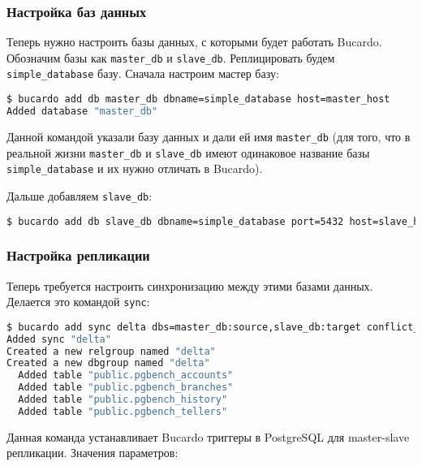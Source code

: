\subsubsection{Настройка баз данных}

Теперь нужно настроить базы данных, с которыми будет работать Bucardo. Обозначим базы как \lstinline!master_db! и \lstinline!slave_db!. Реплицировать будем \lstinline!simple_database! базу. Сначала настроим мастер базу:

\begin{lstlisting}[language=Bash,label=lst:bucardo7,caption=Настройка баз данных]
$ bucardo add db master_db dbname=simple_database host=master_host
Added database "master_db"
\end{lstlisting}

Данной командой указали базу данных и дали ей имя \lstinline!master_db! (для того, что в реальной жизни \lstinline!master_db! и \lstinline!slave_db! имеют одинаковое название базы \lstinline!simple_database! и их нужно отличать в Bucardo).

Дальше добавляем \lstinline!slave_db!:

\begin{lstlisting}[language=Bash,label=lst:bucardo8,caption=Настройка баз данных]
$ bucardo add db slave_db dbname=simple_database port=5432 host=slave_host
\end{lstlisting}

\subsubsection{Настройка репликации}

Теперь требуется настроить синхронизацию между этими базами данных. Делается это командой \lstinline!sync!:

\begin{lstlisting}[language=Bash,label=lst:bucardo9,caption=Настройка репликации]
$ bucardo add sync delta dbs=master_db:source,slave_db:target conflict_strategy=bucardo_latest tables=all
Added sync "delta"
Created a new relgroup named "delta"
Created a new dbgroup named "delta"
  Added table "public.pgbench_accounts"
  Added table "public.pgbench_branches"
  Added table "public.pgbench_history"
  Added table "public.pgbench_tellers"
\end{lstlisting}

Данная команда устанавливает Bucardo триггеры в PostgreSQL для master-slave репликации. Значения параметров:


